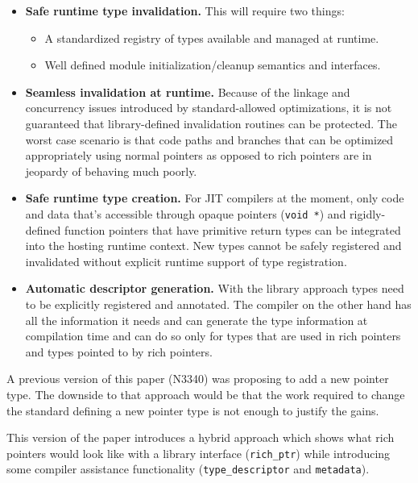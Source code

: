 \begin{itemize}

  \item \textbf{Safe runtime type invalidation.} This will require two things:

  \begin{itemize}

   \item A standardized registry of types available and managed at runtime.

   \item Well defined module initialization/cleanup semantics and interfaces.

  \end{itemize}

  \item \textbf{Seamless invalidation at runtime.} Because of the linkage and
  concurrency issues introduced by standard-allowed optimizations, it is not
  guaranteed that library-defined invalidation routines can be protected. The
  worst case scenario is that code paths and branches that can be optimized
  appropriately using normal pointers as opposed to rich pointers are in
  jeopardy of behaving much poorly.

  \item \textbf{Safe runtime type creation.} For JIT compilers at the moment,
  only code and data that’s accessible through opaque pointers (\verb+void *+)
  and rigidly-defined function pointers that have primitive return types can
  be integrated into the hosting runtime context. New types cannot be safely
  registered and invalidated without explicit runtime support of type
  registration.

  \item \textbf{Automatic descriptor generation.} With the library approach
  types need to be explicitly registered and annotated. The compiler on the
  other hand has all the information it needs and can generate the type
  information at compilation time and can do so only for types that are used
  in rich pointers and types pointed to by rich pointers.

\end{itemize}

A previous version of this paper (N3340) was proposing to add a new pointer
type. The downside to that approach would be that the work required to change
the standard defining a new pointer type is not enough to justify the gains.

This version of the paper introduces a hybrid approach which shows what rich
pointers would look like with a library interface (\verb+rich_ptr+) while
introducing some compiler assistance functionality (\verb+type_descriptor+ and
\verb+metadata+).

